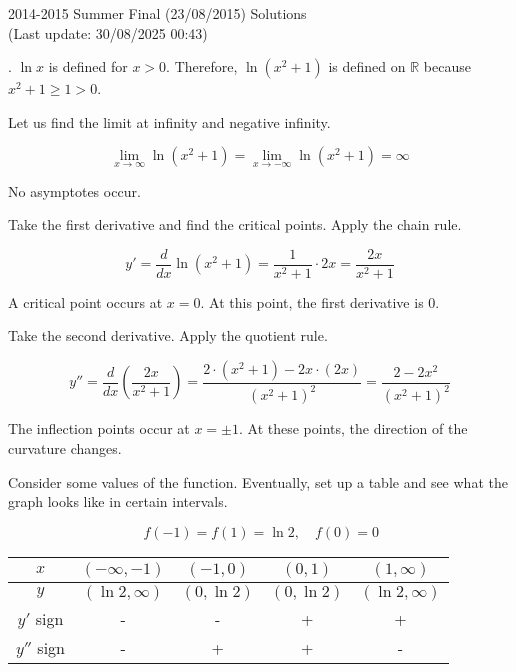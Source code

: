 \documentclass{article}
\begin{document}
\newpage

\begin{center}
2014-2015 Summer Final (23/08/2015) Solutions\\
(Last update: 30/08/2025 00:43)
\end{center}

. $\ln x$ is defined for $x>0$. Therefore, $\ln\left(x^2+1\right)$ is defined on $\mathbb{R}$ because $x^2+1\geq1>0$.

\hfill

\noindent Let us find the limit at infinity and negative infinity.

\begin{equation*}\lim_{x\to\infty}\ln\left(x^2+1\right)=\lim_{x\to-\infty}\ln\left(x^2+1\right)=\infty\end{equation*}

\hfill

\noindent No asymptotes occur.

\hfill

\noindent Take the first derivative and find the critical points. Apply the chain rule.

\[y'=\frac d{dx}\ln\left(x^2+1\right)=\frac1{x^2+1}\cdot 2x=\frac{2x}{x^2+1}\]

\hfill

\noindent A critical point occurs at $x=0$. At this point, the first derivative is $0$.

\hfill

\noindent Take the second derivative. Apply the quotient rule.

\[y''=\frac d{dx}\left(\frac{2x}{x^2+1}\right)=\frac{2\cdot\left(x^2+1\right)-2x\cdot(2x)}{\left(x^2+1\right)^2}=\frac{2-2x^2}{\left(x^2+1\right)^2}\]

\hfill

\noindent The inflection points occur at $x=\pm1$. At these points, the direction of the curvature changes.

\hfill

\noindent Consider some values of the function. Eventually, set up a table and see what the graph looks like in certain intervals.

\begin{equation*}\,f\left(-1\right)=f\left(1\right)=\ln2,\quad f(0)=0\end{equation*}

\begin{center}
    \large
    \begin{tabular}{|c|cccc|} 
    \hline
        $x$&$\left(-\infty,-1\right)$&$\left(-1,0\right)$&$\left(0,1\right)$&$\left(1, \infty\right)$\\
        \hline
        $y$&$(\ln2,\infty)$&$(0,\ln2)$&$(0,\ln2)$&$(\ln2,\infty)$\\
        \hline
        $y'$ sign&-&-&+&+\\
        \hline
        $y''$ sign&-&+&+&-\\
        \hline
    \end{tabular}
\end{center}
\end{document}
